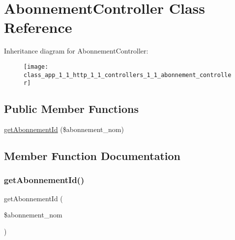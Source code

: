 \hypertarget{class_app_1_1_http_1_1_controllers_1_1_abonnement_controller}{}\section{Abonnement\+Controller Class Reference}
\label{class_app_1_1_http_1_1_controllers_1_1_abonnement_controller}
Inheritance diagram for Abonnement\+Controller\+:\begin{figure}[H]
\begin{center}
\leavevmode
\texttt{[image: class\_app\_1\_1\_http\_1\_1\_controllers\_1\_1\_abonnement\_controller]}
\end{center}
\end{figure}
\subsection*{Public Member Functions}
\begin{DoxyCompactItemize}
\item 
\mbox{\hyperlink{class_app_1_1_http_1_1_controllers_1_1_abonnement_controller_ae92fa6aedca2e68a01da2a37ccc88f3f}{get\+Abonnement\+Id}} (\$abonnement\+\_\+nom)
\end{DoxyCompactItemize}


\subsection{Member Function Documentation}
\mbox{\label{class_app_1_1_http_1_1_controllers_1_1_abonnement_controller_ae92fa6aedca2e68a01da2a37ccc88f3f}} 
\subsubsection{\texorpdfstring{get\+Abonnement\+Id()}{getAbonnementId()}}
{\footnotesize\ttfamily get\+Abonnement\+Id (\begin{DoxyParamCaption}\item[{}]{\$abonnement\+\_\+nom }\end{DoxyParamCaption})}

